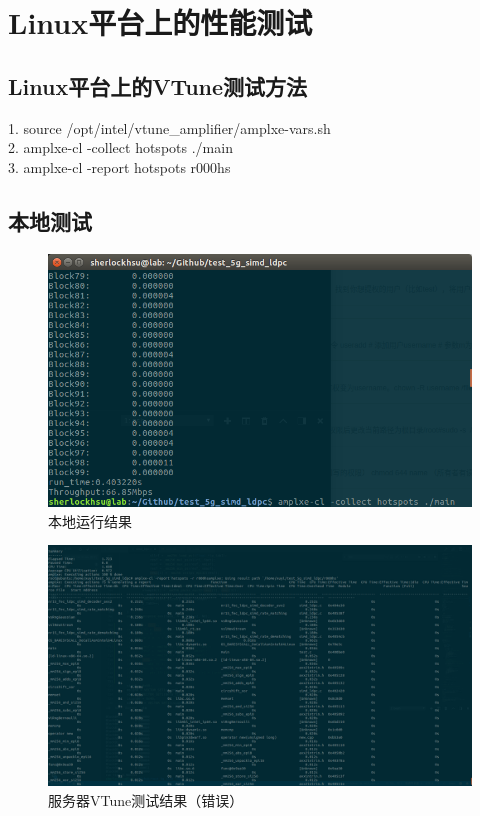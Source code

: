 \documentclass{article}
\begin{document}
\section{Linux平台上的性能测试}
\subsection{Linux平台上的VTune测试方法}
1. source /opt/intel/vtune\_amplifier/amplxe-vars.sh\\
2. amplxe-cl -collect hotspots ./main\\
3. amplxe-cl -report hotspots r000hs
\subsection{本地测试}
\begin{figure}[H]
	\centering
	\includegraphics[width = .8\textwidth]{resl.png}
	\caption{本地运行结果}
\end{figure}
\begin{figure}[H]
	\centering
	\includegraphics[width = \textwidth]{vtuneo.png}
	\caption{服务器VTune测试结果（错误）}
\end{figure}
\end{document}
